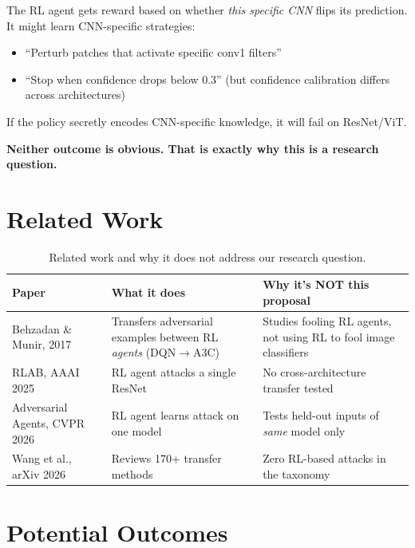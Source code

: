 \documentclass[11pt,a4paper]{article}
\begin{document}
The RL agent gets reward based on whether \textit{this specific CNN} flips its prediction. It might learn CNN-specific strategies:
\begin{itemize}
    \item ``Perturb patches that activate specific conv1 filters''
    \item ``Stop when confidence drops below 0.3'' (but confidence calibration differs across architectures)
\end{itemize}

If the policy secretly encodes CNN-specific knowledge, it will fail on ResNet/ViT.

\textbf{Neither outcome is obvious. That is exactly why this is a research question.}

\section{Related Work}

\begin{table}[H]
\centering
\begin{tabular}{@{}lp{4.5cm}p{5cm}@{}}
\toprule
\textbf{Paper} & \textbf{What it does} & \textbf{Why it's NOT this proposal} \\
\midrule
Behzadan \& Munir, 2017 & Transfers adversarial examples between RL \textit{agents} (DQN$\to$A3C) & Studies fooling RL agents, not using RL to fool image classifiers \\
\midrule
RLAB, AAAI 2025 & RL agent attacks a single ResNet & No cross-architecture transfer tested \\
\midrule
Adversarial Agents, CVPR 2026 & RL agent learns attack on one model & Tests held-out inputs of \textit{same} model only \\
\midrule
Wang et al., arXiv 2026 & Reviews 170+ transfer methods & Zero RL-based attacks in the taxonomy \\
\bottomrule
\end{tabular}
\caption{Related work and why it does not address our research question.}
\end{table}

\section{Potential Outcomes}
\end{document}
